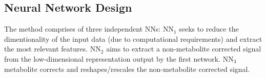     \vspace{-0.5cm}
    
    \subsection{Neural Network Design}\label{sec:NNDesign}
        The method comprises of three independent \glspl{NN}: \gls{NN}$_1$ seeks to reduce the dimentionality of the input data (due to computational requirements) and extract the most relevant features. \gls{NN}$_2$ aims to extract a non-metabolite corrected signal from the low-dimensional representation output by the first network. \gls{NN}$_3$ metabolite corrects and reshapes/rescales the non-metabolite corrected signal. 


